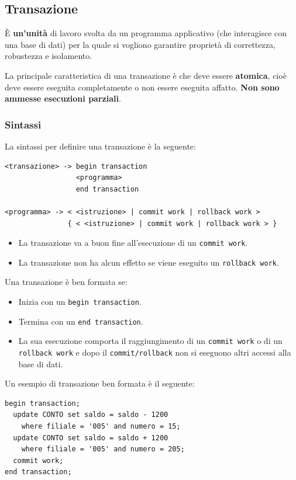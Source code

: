 \documentclass[a4paper,twoside]{article}
\begin{document}
\subsection{Transazione}
\begin{definition}
  È \textbf{un’unità} di lavoro svolta da un programma applicativo (che interagisce con una base
  di dati) per la quale si vogliono garantire proprietà di correttezza, robustezza e
  isolamento.
\end{definition}
La principale caratteristica di una transazione è che deve essere \textbf{atomica}, cioè
deve essere eseguita completamente o non essere eseguita affatto. \textbf{Non sono
ammesse esecuzioni parziali}.

\subsubsection{Sintassi}
La sintassi per definire una transazione è la seguente:
\begin{lstlisting}
<transazione> -> begin transaction
                 <programma>
                 end transaction

<programma> -> < <istruzione> | commit work | rollback work >
               { < <istruzione> | commit work | rollback work > }
\end{lstlisting}
\begin{itemize}
  \item La transazione va a buon fine all'esecuzione di un \texttt{commit work}.
  \item La transazione non ha alcun effetto se viene eseguito un \texttt{rollback work}.
\end{itemize}

\vspace{1em}
\noindent
Una transazione è ben formata se:
\begin{itemize}
  \item Inizia con un \texttt{begin transaction}.
  \item Termina con un \texttt{end transaction}.
  \item La sua esecuzione comporta il raggiungimento di un \texttt{commit work} o di un
    \texttt{rollback work} e dopo il \texttt{commit/rollback} non si eseguono altri
    accessi alla base di dati.
\end{itemize}

\begin{example}
  Un esempio di transazione ben formata è il seguente:
\begin{lstlisting}
begin transaction;
  update CONTO set saldo = saldo - 1200
    where filiale = '005' and numero = 15;
  update CONTO set saldo = saldo + 1200
    where filiale = '005' and numero = 205;
  commit work;
end transaction;
\end{lstlisting}
\end{example}
\end{document}
